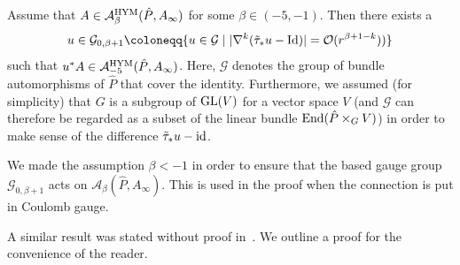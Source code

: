 \documentclass[11pt,a4paper]{scrartcl}
\newcommand{\End}{\textup{End}}
\newcommand{\id}{\textup{id}}
\newcommand{\GL}{\textup{GL}}
\numberwithin{equation}{section}
\theoremstyle{plain}
\theoremstyle{definition}
\theoremstyle{remark}
\begin{document}
\begin{proposition}\label{prop:HYMConnection improve decay}
Assume that $A \in \mathcal{A}_\beta^{\textup{HYM}}(\hat{P},A_\infty)$ for some $\beta\in(-5,-1)$. Then there exists a \[u\in \mathcal{G}_{0,\beta+1}\coloneqq \{u \in  \mathcal{G} \mid \vert \nabla^k(\tilde{\tau}_* u - \textup{Id} ) \vert = \mathcal{O}(r^{\beta+1-k})) \}\] such that $u^*A \in \mathcal{A}_{-5}^{\textup{HYM}}(\hat{P},A_\infty)$. Here, $\mathcal{G}$ denotes the group of bundle automorphisms of $\hat{P}$ that cover the identity. Furthermore, we assumed (for simplicity) that $G$ is a subgroup of $\GL(V)$ for a vector space $V$ (and $\mathcal{G}$ can therefore be regarded as a subset of the linear bundle $\End(\hat{P}\times_G V)$) in order to make sense of the difference $\tilde{\tau}_*u-\id$.
\end{proposition}
\begin{remark}
We made the assumption $\beta<-1$ in order to ensure that the based gauge group $\mathcal{G}_{0,\beta+1}$ acts on $\mathcal{A}_\beta(\hat{P},A_\infty)$. This is used in the proof when the connection is put in Coulomb gauge.
\end{remark}
A similar result was stated without proof in~\cite[Remark~4.8]{WalpuskiDegeratu-HYM_on_crepant_resolutions}. We outline a proof for the convenience of the reader.
\end{document}
